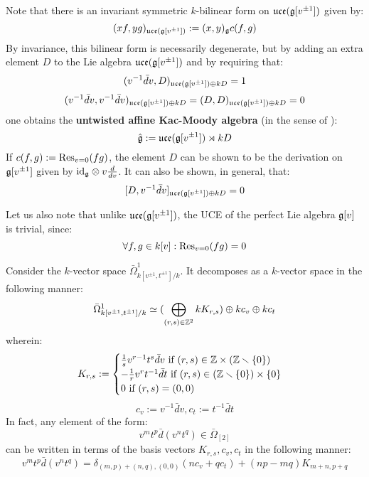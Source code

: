 \begin{example}
            Note that there is an invariant symmetric $k$-bilinear form on $\mathfrak{uce}(\mathfrak{g}[v^{\pm 1}])$ given by:
                $$(x f, y g)_{\mathfrak{uce}(\mathfrak{g}[v^{\pm 1}])} := (x, y)_{\mathfrak{g}} c(f, g)$$
            By invariance, this bilinear form is necessarily degenerate, but by adding an extra element $D$ to the Lie algebra $\mathfrak{uce}(\mathfrak{g}[v^{\pm 1}])$ and by requiring that:
                $$(v^{-1} \bar{d}v, D)_{\mathfrak{uce}(\mathfrak{g}[v^{\pm 1}]) \oplus k D} = 1$$
                $$(v^{-1} \bar{d}v, v^{-1} \bar{d}v)_{\mathfrak{uce}(\mathfrak{g}[v^{\pm 1}]) \oplus k D} = (D, D)_{\mathfrak{uce}(\mathfrak{g}[v^{\pm 1}]) \oplus k D} = 0$$
            one obtains the \textbf{untwisted affine Kac-Moody algebra} (in the sense of \cite[Chapter 7]{kac_infinite_dimensional_lie_algebras}):
                $$\hat{\mathfrak{g}} := \mathfrak{uce}(\mathfrak{g}[v^{\pm 1}]) \rtimes k D$$
            If $c(f, g) := \mathrm{Res}_{v = 0}(fg)$, the element $D$ can be shown to be the derivation on $\mathfrak{g}[v^{\pm 1}]$ given by $\id_{\g} \tensor v \frac{d}{dv}$. It can also be shown, in general, that:
                $$[D, v^{-1} \bar{d}v]_{\mathfrak{uce}(\mathfrak{g}[v^{\pm 1}]) \oplus k D} = 0$$

            Let us also note that unlike $\mathfrak{uce}(\mathfrak{g}[v^{\pm 1}])$, the UCE of the perfect Lie algebra $\mathfrak{g}[v]$ is trivial, since:
                $$\forall f, g \in k[v]: \mathrm{Res}_{v = 0}(fg) = 0$$
        \end{example}
        \begin{example}
            Consider the $k$-vector space $\bar{\Omega}^1_{k[v^{\pm 1}, t^{\pm 1}]/k}$. It decomposes as a $k$-vector space in the following manner:
                $$\bar{\Omega}^1_{k[v^{\pm 1}, t^{\pm 1}]/k} \simeq ( \bigoplus_{(r, s) \in \mathbb{Z}^2} k K_{r, s}) \oplus k c_v \oplus k c_t$$
            wherein:
                $$
                    K_{r, s} :=
                    \begin{cases}
                        \text{$\frac1s v^{r - 1} t^s \bar{d}v$ if $(r, s) \in \Z \x (\Z \setminus \{0\})$}
                        \\
                        \text{$-\frac1r v^r t^{-1} \bar{d}t$ if $(r, s) \in (\Z \setminus \{0\}) \x \{0\}$}
                        \\
                        \text{$0$ if $(r, s) = (0, 0)$}
                    \end{cases}
                $$
                $$c_v := v^{-1} \bar{d}v, c_t := t^{-1} \bar{d}t$$
            In fact, any element of the form:
                $$v^m t^p \bar{d}(v^n t^q) \in \bar{\Omega}_{[2]}$$
            can be written in terms of the basis vectors $K_{r, s}, c_v, c_t$ in the following manner:
                $$v^m t^p \bar{d}(v^n t^q) = \delta_{(m, p) + (n, q), (0, 0)} ( n c_v + q c_t ) + (np - mq) K_{m + n, p + q}$$
        \end{example}
